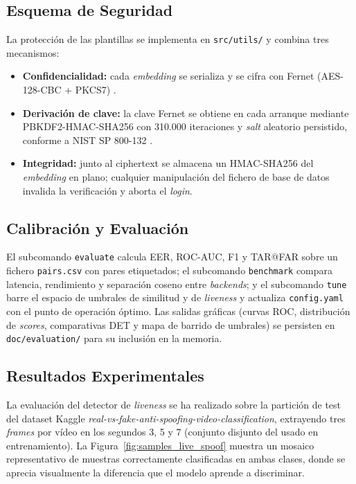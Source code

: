 \subsection{Esquema de Seguridad}
\label{subsec:seguridad}

La protección de las plantillas se implementa en \texttt{src/utils/} y combina tres mecanismos:

\begin{itemize}
    \item \textbf{Confidencialidad:} cada \textit{embedding} se serializa y se cifra con Fernet (AES-128-CBC + PKCS7) \cite{fernet}.
    \item \textbf{Derivación de clave:} la clave Fernet se obtiene en cada arranque mediante PBKDF2-HMAC-SHA256 con 310.000 iteraciones y \textit{salt} aleatorio persistido, conforme a NIST SP 800-132 \cite{nist800132}.
    \item \textbf{Integridad:} junto al ciphertext se almacena un HMAC-SHA256 del \textit{embedding} en plano; cualquier manipulación del fichero de base de datos invalida la verificación y aborta el \textit{login}.
\end{itemize}

\subsection{Calibración y Evaluación}
\label{subsec:calibracion}

El subcomando \texttt{evaluate} calcula EER, ROC-AUC, F1 y TAR@FAR sobre un fichero \texttt{pairs.csv} con pares etiquetados; el subcomando \texttt{benchmark} compara latencia, rendimiento y separación coseno entre \textit{backends}; y el subcomando \texttt{tune} barre el espacio de umbrales de similitud y de \textit{liveness} y actualiza \texttt{config.yaml} con el punto de operación óptimo. Las salidas gráficas (curvas ROC, distribución de \textit{scores}, comparativas DET y mapa de barrido de umbrales) se persisten en \texttt{doc/evaluation/} para su inclusión en la memoria.

\subsection{Resultados Experimentales}
\label{subsec:resultados}

La evaluación del detector de \textit{liveness} se ha realizado sobre la partición de test del dataset Kaggle \textit{real-vs-fake-anti-spoofing-video-classification}, extrayendo tres \textit{frames} por vídeo en los segundos 3, 5 y 7 (conjunto disjunto del usado en entrenamiento). La Figura~\ref{fig:samples_live_spoof} muestra un mosaico representativo de muestras correctamente clasificadas en ambas clases, donde se aprecia visualmente la diferencia que el modelo aprende a discriminar.


